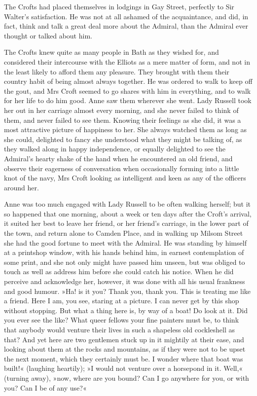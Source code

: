 The Crofts had placed themselves in lodgings in Gay Street, perfectly to Sir Walter's satisfaction. He was not at all ashamed of the acquaintance, and did, in fact, think and talk a great deal more about the Admiral, than the Admiral ever thought or talked about him.

The Crofts knew quite as many people in Bath as they wished for, and considered their intercourse with the Elliots as a mere matter of form, and not in the least likely to afford them any pleasure. They brought with them their country habit of being almost always together. He was ordered to walk to keep off the gout, and Mrs Croft seemed to go shares with him in everything, and to walk for her life to do him good. Anne saw them wherever she went. Lady Russell took her out in her carriage almost every morning, and she never failed to think of them, and never failed to see them. Knowing their feelings as she did, it was a most attractive picture of happiness to her. She always watched them as long as she could, delighted to fancy she understood what they might be talking of, as they walked along in happy independence, or equally delighted to see the Admiral's hearty shake of the hand when he encountered an old friend, and observe their eagerness of conversation when occasionally forming into a little knot of the navy, Mrs Croft looking as intelligent and keen as any of the officers around her.

Anne was too much engaged with Lady Russell to be often walking herself; but it so happened that one morning, about a week or ten days after the Croft's arrival, it suited her best to leave her friend, or her friend's carriage, in the lower part of the town, and return alone to Camden Place, and in walking up Milsom Street she had the good fortune to meet with the Admiral. He was standing by himself at a printshop window, with his hands behind him, in earnest contemplation of some print, and she not only might have passed him unseen, but was obliged to touch as well as address him before she could catch his notice. When he did perceive and acknowledge her, however, it was done with all his usual frankness and good humour. »Ha! is it you? Thank you, thank you. This is treating me like a friend. Here I am, you see, staring at a picture. I can never get by this shop without stopping. But what a thing here is, by way of a boat! Do look at it. Did you ever see the like? What queer fellows your fine painters must be, to think that anybody would venture their lives in such a shapeless old cockleshell as that? And yet here are two gentlemen stuck up in it mightily at their ease, and looking about them at the rocks and mountains, as if they were not to be upset the next moment, which they certainly must be. I wonder where that boat was built!« (laughing heartily); »I would not venture over a horsepond in it. Well,« (turning away), »now, where are you bound? Can I go anywhere for you, or with you? Can I be of any use?«

